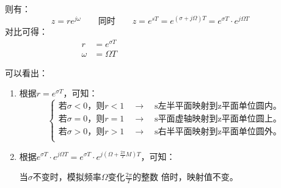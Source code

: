 \documentclass[notheorems,compress,mathserif,table]{beamer}
\begin{document}
\begin{frame}[shrink]\frametitle{}%
则有：
$$z=re^{j\omega} \qquad\mbox{同时}\qquad z= e^{sT} = e^{(\sigma+j\Omega)T} = e^{\sigma T}\cdot e^{j\Omega T}\qquad $$%
$\mbox{对比可得：}$
\begin{equation*}
  \begin{split}
     r       &= e^{\sigma T} \quad\quad\quad\quad\quad\quad\quad\quad\quad\quad\quad\quad\quad\quad\\
     \omega  &= \Omega T
   \end{split}
\end{equation*}





可以看出：
    \begin{enumerate}
        \item 根据$r= e^{\sigma T}$，可知：
            $$
              \left\{
              \begin{aligned}
              \mbox{若$\sigma<0$，则$r<1$$\quad\longrightarrow\quad$
              s左半平面映射到z平面单位圆内。}\\
              \mbox{若$\sigma=0$，则$r=1$$\quad\longrightarrow\quad$
              s平面虚轴映射到z平面单位圆上。}\\
              \mbox{若$\sigma>0$，则$r>1$$\quad\longrightarrow\quad$
              s右半平面映射到z平面单位圆外。}\\
              \end{aligned}
              \right.
            $$
        \item 根据$e^{\sigma T}\cdot e^{j\Omega T} = e^{\sigma T}\cdot e^{j(\Omega+\frac{2\pi}{T}M)T}$，可知：\par
            当$\sigma$不变时，模拟频率$\Omega$变化$\frac{2\pi}{T}$的整数
                          倍时，映射值不变。
    \end{enumerate}

\end{frame}
%
%
\end{document}
